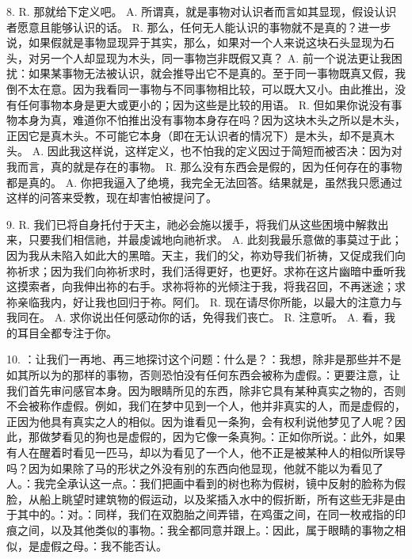 8. R. 那就给下定义吧。 A. 所谓真，就是事物对认识者而言如其显现，假设认识者愿意且能够认识的话。 R. 那么，任何无人能认识的事物就不是真的？进一步说，如果假就是事物显现异于其实，那么，如果对一个人来说这块石头显现为石头，对另一个人却显现为木头，同一事物岂非既假又真？ A. 前一个说法更让我困扰：如果某事物无法被认识，就会推导出它不是真的。至于同一事物既真又假，我倒不太在意。因为我看同一事物与不同事物相比较，可以既大又小。由此推出，没有任何事物本身是更大或更小的；因为这些是比较的用语。 R. 但如果你说没有事物本身为真，难道你不怕推出没有事物本身存在吗？因为这块木头之所以是木头，正因它是真木头。不可能它本身（即在无认识者的情况下）是木头，却不是真木头。 A. 因此我这样说，这样定义，也不怕我的定义因过于简短而被否决：因为对我而言，真的就是存在的事物。 R. 那么没有东西会是假的，因为任何存在的事物都是真的。 A. 你把我逼入了绝境，我完全无法回答。结果就是，虽然我只愿通过这样的问答来受教，现在却害怕被提问了。\par

9. R. 我们已将自身托付于天主，祂必会施以援手，将我们从这些困境中解救出来，只要我们相信祂，并最虔诚地向祂祈求。 A. 此刻我最乐意做的事莫过于此；因为我从未陷入如此大的黑暗。天主，我们的父，祢劝导我们祈祷，又促成我们向祢祈求；因为我们向祢祈求时，我们活得更好，也更好。求祢在这片幽暗中垂听我这摸索者，向我伸出祢的右手。求祢将祢的光倾注于我，将我召回，不再迷途；求祢亲临我内，好让我也回归于祢。阿们。 R. 现在请尽你所能，以最大的注意力与我同在。 A. 求你说出任何感动你的话，免得我们丧亡。 R. 注意听。 A. 看，我的耳目全都专注于你。\par

10. ：让我们一再地、再三地探讨这个问题：什么是？：我想，除非是那些并不是如其所以为的那样的事物，否则恐怕没有任何东西会被称为虚假。：更要注意，让我们首先审问感官本身。因为眼睛所见的东西，除非它具有某种真实之物的，否则不会被称作虚假。例如，我们在梦中见到一个人，他并非真实的人，而是虚假的，正因为他具有真实之人的相似。因为谁看见一条狗，会有权利说他梦见了人呢？因此，那做梦看见的狗也是虚假的，因为它像一条真狗。：正如你所说。：此外，如果有人在醒着时看见一匹马，却以为看见了一个人，他不正是被某种人的相似所误导吗？因为如果除了马的形状之外没有别的东西向他显现，他就不能以为看见了人。：我完全承认这一点。：我们把画中看到的树也称为假树，镜中反射的脸称为假脸，从船上眺望时建筑物的假运动，以及桨插入水中的假折断，所有这些无非是由于其中的。：对。：同样，我们在双胞胎之间弄错，在鸡蛋之间，在同一枚戒指的印痕之间，以及其他类似的事物。：我全都同意并跟上。：因此，属于眼睛的事物之相似，是虚假之母。：我不能否认。\par

